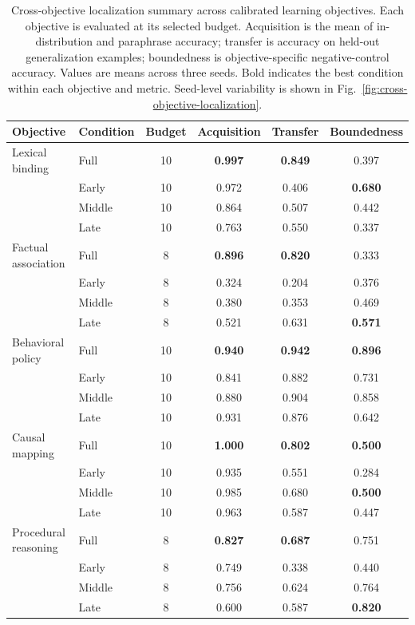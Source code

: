 \begin{table}[t]
\centering
\small
\setlength{\tabcolsep}{7pt}
\begin{tabular}{llcccc}
\toprule
Objective & Condition & Budget & Acquisition & Transfer & Boundedness \\
\midrule
Lexical binding & Full & 10 & \textbf{0.997} & \textbf{0.849} & 0.397 \\
 & Early & 10 & 0.972 & 0.406 & \textbf{0.680} \\
 & Middle & 10 & 0.864 & 0.507 & 0.442 \\
 & Late & 10 & 0.763 & 0.550 & 0.337 \\
\addlinespace[0.35em]
Factual association & Full & 8 & \textbf{0.896} & \textbf{0.820} & 0.333 \\
 & Early & 8 & 0.324 & 0.204 & 0.376 \\
 & Middle & 8 & 0.380 & 0.353 & 0.469 \\
 & Late & 8 & 0.521 & 0.631 & \textbf{0.571} \\
\addlinespace[0.35em]
Behavioral policy & Full & 10 & \textbf{0.940} & \textbf{0.942} & \textbf{0.896} \\
 & Early & 10 & 0.841 & 0.882 & 0.731 \\
 & Middle & 10 & 0.880 & 0.904 & 0.858 \\
 & Late & 10 & 0.931 & 0.876 & 0.642 \\
\addlinespace[0.35em]
Causal mapping & Full & 10 & \textbf{1.000} & \textbf{0.802} & \textbf{0.500} \\
 & Early & 10 & 0.935 & 0.551 & 0.284 \\
 & Middle & 10 & 0.985 & 0.680 & \textbf{0.500} \\
 & Late & 10 & 0.963 & 0.587 & 0.447 \\
\addlinespace[0.35em]
Procedural reasoning & Full & 8 & \textbf{0.827} & \textbf{0.687} & 0.751 \\
 & Early & 8 & 0.749 & 0.338 & 0.440 \\
 & Middle & 8 & 0.756 & 0.624 & 0.764 \\
 & Late & 8 & 0.600 & 0.587 & \textbf{0.820} \\
\bottomrule
\end{tabular}
\caption{
Cross-objective localization summary across calibrated learning objectives.
Each objective is evaluated at its selected budget.
Acquisition is the mean of in-distribution and paraphrase accuracy; transfer is accuracy on held-out generalization examples; boundedness is objective-specific negative-control accuracy.
Values are means across three seeds.
Bold indicates the best condition within each objective and metric.
Seed-level variability is shown in Fig.~\ref{fig:cross-objective-localization}.
}
\label{tab:cross-objective-localization}
\end{table}
